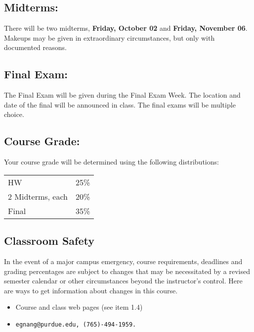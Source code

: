 \documentclass[10pt]{article}
\begin{document}
\subsection{Midterms:}  
	There will be two midterms, {\bf Friday, October 02} and 
  {\bf Friday, November 06}. Makeups may be given in extraordinary
  circumstances, but only with documented reasons.

\subsection{Final Exam:}
        The Final Exam will be given during the Final Exam Week.
        The location and date of the final will be announced in class.
	The final exams will be multiple choice.

\subsection{Course Grade:}
        Your course grade will be determined using the following 
        distributions:

\begin{tabular}{ll}\\
        HW 		&    25\%\\
        2 Midterms, each     &  20\%\\
        Final          &     35\%\\
\end{tabular}


\subsection{Classroom Safety}
In the event of a major campus emergency, course requirements,
deadlines and grading percentages are subject to changes that may be
necessitated by a revised semester calendar or other circumstances
beyond the instructor's control. Here are ways to get information
about changes in this course.

\begin{itemize}
\item Course and class web pages (see item 1.4)
\item \tt{egnang@purdue.edu}, \tt{(765)-494-1959}.
\end{itemize}
\end{document}
